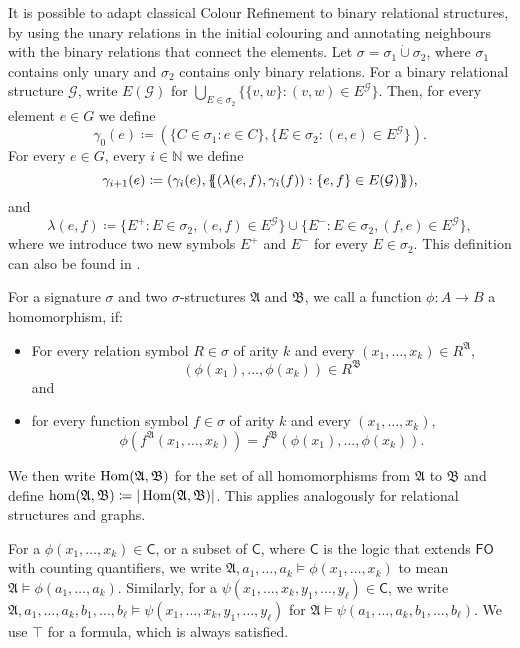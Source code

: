 It is possible to adapt classical Colour Refinement to binary relational structures, by using the unary relations in the initial colouring and annotating neighbours with the binary relations that connect the elements.
Let $\sigma=\sigma_1\operatorname{\dot{\cup}}\sigma_2$, where $\sigma_1$ contains only unary and $\sigma_2$ contains only binary relations.
For a binary relational structure $\mathcal G$, write $E(\mathcal G)$ for $\bigcup_{E\in \sigma_2} \{\{v,w \} : (v,w)\in E^{\mathcal G}\}$.
Then, for every element $e\in G$ we define
$$\gamma_0(e)\coloneqq(\{C\in \sigma_1 : e\in C\}, \{E\in \sigma_2 : (e,e)\in E^{\mathcal G}\}).$$
For every $e\in G$, every $i\in \mathbb N$ we define 
$$\gamma_{i+1}(e)\coloneqq(\gamma_i(e), \left\{\kern-.35em\left\{(\lambda(e,f), \gamma_i(f)) : \{e,f\}\in E(\mathcal G)\right\}\kern-.35em\right\}),$$
and
$$\lambda(e,f)\coloneqq\{E^+ : E\in\sigma_2, (e,f)\in E^{\mathcal G}\} \cup \{E^- : E\in \sigma_2, (f,e)\in E^{\mathcal G}\},$$
where we introduce two new symbols $E^+$ and $E^-$ for every $E\in \sigma_2$.
This definition can also be found in \cite{scheidt2025ColorRefinement}.

For a signature $\sigma$ and two $\sigma$-structures $\mathfrak A$ and $\mathfrak B$, we call a function $\phi:A\to B$ a homomorphism, if:
\begin{itemize}
	\item For every relation symbol $R\in\sigma$ of arity $k$ and every $(x_1,\dots,x_k)\in R^{\mathfrak A}$,
	$$(\phi(x_1),\dots,\phi(x_k))\in R^{\mathfrak B}$$ 
	and
	\item for every function symbol $f\in \sigma$ of arity $k$ and every $(x_1,\dots,x_k)$, 
	$$\phi(f^{\mathfrak A}(x_1,\dots,x_k))=f^{\mathfrak B}(\phi(x_1),\dots,\phi(x_k)).$$
\end{itemize}
We then write $\operatorname{Hom}(\mathfrak A, \mathfrak B)$ for the set of all homomorphisms from $\mathfrak A$ to $\mathfrak B$ and define $\hom(\mathfrak A,\mathfrak B)\coloneqq \vert\operatorname{Hom}(\mathfrak A,\mathfrak B)\vert$.
This applies analogously for relational structures and graphs.

For a $\phi(x_1,\dots,x_k)\in\mathsf C$, or a subset of $\mathsf{C}$, where $\mathsf C$ is the logic that extends $\mathsf{FO}$ with counting quantifiers, we write $\mathfrak A,a_1,\dots,a_k\models \phi(x_1,\dots,x_k)$ to mean $\mathfrak A\models \phi(a_1,\dots,a_k)$.
Similarly, for a $\psi(x_1,\dots,x_k,y_1,\dots,y_\ell)\in\mathsf C$, we write $\mathfrak A,a_1,\dots,a_k,b_1,\dots,b_\ell\models \psi(x_1,\dots,x_k,y_1,\dots,y_\ell)$ for $\mathfrak A\models \psi(a_1,\dots,a_k,b_1,\dots,b_\ell)$.
We use $\top$ for a formula, which is always satisfied.






